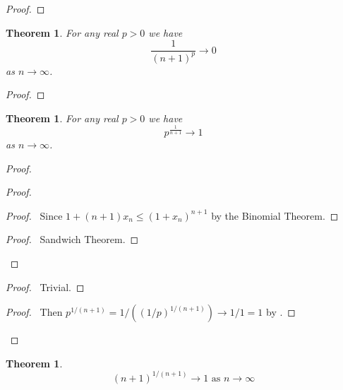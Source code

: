 \documentclass{book}
\let\qed\relax
\newtheorem{thm}[prop]{Theorem}
\theoremstyle{definition}
\begin{document}
\begin{proof}
\pf
{}
\qed
\end{proof}

\begin{thm}
\label{thm:n_to_the_p_tends_to_zero}
For any real $p > 0$ we have
\[ \frac{1}{(n+1)^p} \rightarrow 0 \]
as $n \rightarrow \infty$.
\end{thm}

\begin{proof}
\pf
{}
\qed
\end{proof}

\begin{thm}
\label{thm:p_to_the_one_over_n_tends_to_one}
For any real $p > 0$ we have
\[ p^{\frac{1}{n+1}} \rightarrow 1 \]
as $n \rightarrow \infty$.
\end{thm}

\begin{proof}
\pf
{}
\begin{proof}
	\begin{proof}
		\pf\ Since $1 + (n+1)x_n \leq (1 + x_n)^{n+1}$ by the Binomial Theorem.
	\end{proof}
	\begin{proof}
		\pf\ Sandwich Theorem.
	\end{proof}
\end{proof}
\begin{proof}
	\pf\ Trivial.
\end{proof}
\begin{proof}
	\pf\ Then $p^{1/(n+1)} = 1/((1/p)^{1/(n+1)}) \rightarrow 1/1 = 1$ by .
\end{proof}
\qed
\end{proof}

\begin{thm}
\[ (n+1)^{1/(n+1)} \rightarrow 1 \text{ as } n \rightarrow \infty \]
\end{thm}
\end{document}
